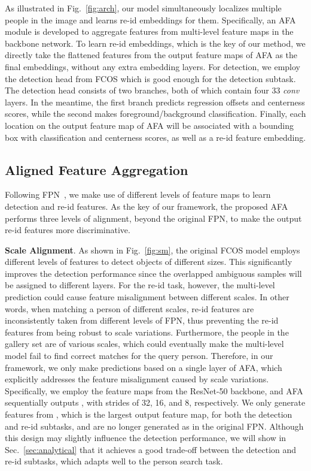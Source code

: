 \documentclass[journal]{IEEEtran}
\begin{document}
As illustrated in Fig.~\ref{fig:arch}, our model simultaneously localizes multiple people in the image and learns re-id embeddings for them. Specifically, an AFA module is developed to aggregate features from multi-level feature maps in the backbone network. To learn re-id embeddings, which is the key of our method, we directly take the flattened features from the output feature maps of AFA as the final embeddings, without any extra embedding layers. For detection, we employ the detection head from FCOS which is good enough for the detection subtask. The detection head consists of two branches, both of which contain four 33 \emph{conv} layers. In the meantime, the first branch predicts regression offsets and centerness scores, while the second makes foreground/background classification. Finally, each location on the output feature map of AFA will be associated with a bounding box with classification and centerness scores, as well as a re-id feature embedding.

\subsection{Aligned Feature Aggregation}
Following FPN~\cite{DBLP:conf/cvpr/LinDGHHB17}, we make use of different levels of feature maps to learn detection and re-id features. As the key of our framework, the proposed AFA performs three levels of alignment, beyond the original FPN, to make the output re-id features more discriminative.


\textbf{Scale Alignment}. As shown in Fig.~\ref{fig:sm}, the original FCOS model employs different levels of features to detect objects of different sizes. This significantly improves the detection performance since the overlapped ambiguous samples will be assigned to different layers. For the re-id task, however, the multi-level prediction could cause feature misalignment between different scales.
In other words, when matching a person of different scales, re-id features are inconsistently taken from different levels of FPN, thus preventing the re-id features from being robust to scale variations.
Furthermore, the people in the gallery set are of various scales, which could eventually make the multi-level model fail to find correct matches for the query person. Therefore, in our framework, we only make predictions based on a single layer of AFA, which explicitly addresses the feature misalignment caused by scale variations. Specifically, we employ the  feature maps from the ResNet-50 backbone, and AFA sequentially outputs , with strides of 32, 16, and 8, respectively. We only generate features from , which is the largest output feature map, for both the detection and re-id subtasks, and  are no longer generated as in the original FPN. Although this design may slightly influence the detection performance, we will show in Sec.~\ref{sec:analytical} that it achieves a good trade-off between the detection and re-id subtasks, which adapts well to the person search task.
\end{document}
